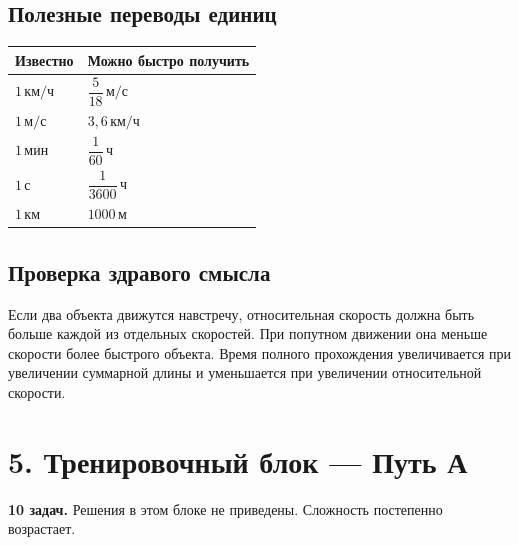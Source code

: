\documentclass[a4paper,12pt]{article}
\newcommand{\sectionline}{\par\vspace{2mm}{\color{accent}\hrule height 0.7pt}\vspace{3mm}}
\newcommand{\unit}[1]{\,\text{#1}}
\begin{document}
\subsection*{Полезные переводы единиц}
\begin{center}
\begin{tabular}{@{}ll@{}}
\toprule
Известно & Можно быстро получить \\
\midrule
\(1\unit{км/ч}\) & \(\dfrac{5}{18}\unit{м/с}\) \\
\(1\unit{м/с}\) & \(3{,}6\unit{км/ч}\) \\
\(1\unit{мин}\) & \(\dfrac{1}{60}\unit{ч}\) \\
\(1\unit{с}\) & \(\dfrac{1}{3600}\unit{ч}\) \\
\(1\unit{км}\) & \(1000\unit{м}\) \\
\bottomrule
\end{tabular}
\end{center}

\subsection*{Проверка здравого смысла}
Если два объекта движутся навстречу, относительная скорость должна быть больше каждой из отдельных скоростей. При попутном движении она меньше скорости более быстрого объекта. Время полного прохождения увеличивается при увеличении суммарной длины и уменьшается при увеличении относительной скорости.

\clearpage
\section*{5. Тренировочный блок --- Путь А}
\sectionline
\textbf{10 задач.} Решения в этом блоке не приведены. Сложность постепенно возрастает.
\end{document}
